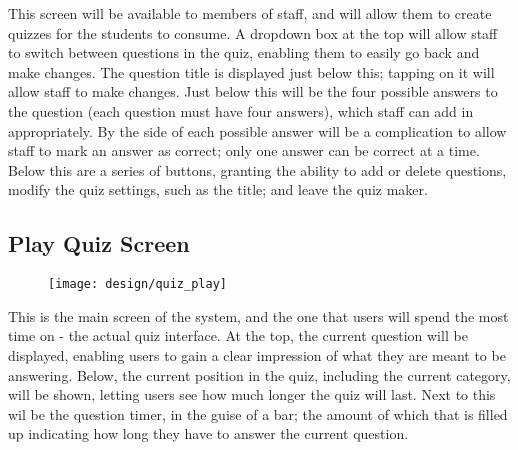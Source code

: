 This screen will be available to members of staff, and will allow them to create quizzes for the students to consume. A dropdown box at the top will allow staff to switch between questions in the quiz, enabling them to easily go back and make changes. The question title is displayed just below this; tapping on it will allow staff to make changes. Just below this will be the four possible answers to the question (each question must have four answers), which staff can add in appropriately. By the side of each possible answer will be a complication to allow staff to mark an answer as correct; only one answer can be correct at a time. Below this are a series of buttons, granting the ability to add or delete questions, modify the quiz settings, such as the title; and leave the quiz maker.

\clearpage

\subsection{Play Quiz Screen}
\begin{figure}[h!]
  \texttt{[image: design/quiz\_play]}
\end{figure}

This is the main screen of the system, and the one that users will spend the most time on - the actual quiz interface. At the top, the current question will be displayed, enabling users to gain a clear impression of what they are meant to be answering. Below, the current position in the quiz, including the current category, will be shown, letting users see how much longer the quiz will last. Next to this wil be the question timer, in the guise of a bar; the amount of which that is filled up indicating how long they have to answer the current question.
